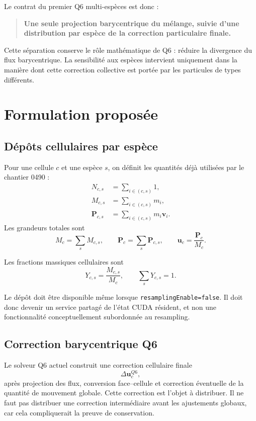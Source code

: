 \documentclass[11pt,a4paper]{article}
\newcommand{\code}[1]{\texttt{#1}}
\newcommand{\vect}[1]{\bm{#1}}
\begin{document}
Le contrat du premier Q6 multi-espèces est donc :
\begin{quote}
\textbf{Une seule projection barycentrique du mélange, suivie d'une distribution par espèce de la correction particulaire finale.}
\end{quote}

Cette séparation conserve le rôle mathématique de Q6 : réduire la divergence du flux barycentrique. La sensibilité aux espèces intervient uniquement dans la manière dont cette correction collective est portée par les particules de types différents.

\section{Formulation proposée}

\subsection{Dépôts cellulaires par espèce}

Pour une cellule \(c\) et une espèce \(s\), on définit les quantités déjà utilisées par le chantier 0490 :
\begin{align}
  N_{c,s} &= \sum_{i\in(c,s)} 1, \\
  M_{c,s} &= \sum_{i\in(c,s)} m_i, \\
  \vect{P}_{c,s} &= \sum_{i\in(c,s)} m_i\vect{v}_i.
\end{align}
Les grandeurs totales sont
\begin{equation}
  M_c=\sum_s M_{c,s}, \qquad \vect{P}_c=\sum_s\vect{P}_{c,s},
  \qquad \vect{u}_c=\frac{\vect{P}_c}{M_c}.
\end{equation}

Les fractions massiques cellulaires sont
\begin{equation}
  Y_{c,s}=\frac{M_{c,s}}{M_c}, \qquad \sum_sY_{c,s}=1.
\end{equation}

Le dépôt doit être disponible même lorsque \code{resamplingEnable=false}. Il doit donc devenir un service partagé de l'état CUDA résident, et non une fonctionnalité conceptuellement subordonnée au resampling.

\subsection{Correction barycentrique Q6}

Le solveur Q6 actuel construit une correction cellulaire finale
\begin{equation}
  \Delta\vect{u}^{Q6}_c,
\end{equation}
après projection des flux, conversion face--cellule et correction éventuelle de la quantité de mouvement globale. Cette correction est l'objet à distribuer. Il ne faut pas distribuer une correction intermédiaire avant les ajustements globaux, car cela compliquerait la preuve de conservation.
\end{document}

